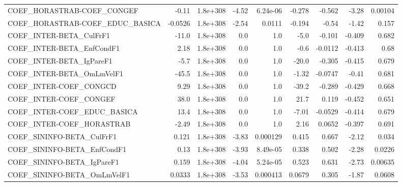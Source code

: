 \begin{tabular}{lrrrrrrrr}
COEF\_HORASTRAB-COEF\_CONGEF            &       -0.11 &     1.8e+308 &    -4.52 & 6.24e-06 &     -0.278 &      -0.562 &        -3.28 &       0.00104 \\
COEF\_HORASTRAB-COEF\_EDUC\_BASICA       &     -0.0526 &     1.8e+308 &    -2.54 &   0.0111 &     -0.194 &       -0.54 &        -1.42 &         0.157 \\
COEF\_INTER-BETA\_CulFrF1               &       -11.0 &     1.8e+308 &      0.0 &      1.0 &       -5.0 &      -0.101 &       -0.409 &         0.682 \\
COEF\_INTER-BETA\_EnfCondF1             &        2.18 &     1.8e+308 &      0.0 &      1.0 &       -0.6 &     -0.0112 &       -0.413 &          0.68 \\
COEF\_INTER-BETA\_IgPareF1              &        -5.7 &     1.8e+308 &      0.0 &      1.0 &      -20.0 &      -0.305 &       -0.415 &         0.679 \\
COEF\_INTER-BETA\_OmLmVelF1             &       -45.5 &     1.8e+308 &      0.0 &      1.0 &      -1.32 &     -0.0747 &        -0.41 &         0.681 \\
COEF\_INTER-COEF\_CONGCD                &        9.29 &     1.8e+308 &      0.0 &      1.0 &      -39.2 &      -0.289 &       -0.429 &         0.668 \\
COEF\_INTER-COEF\_CONGEF                &        38.0 &     1.8e+308 &      0.0 &      1.0 &       21.7 &       0.119 &       -0.452 &         0.651 \\
COEF\_INTER-COEF\_EDUC\_BASICA           &        13.4 &     1.8e+308 &      0.0 &      1.0 &      -7.01 &     -0.0529 &       -0.414 &         0.679 \\
COEF\_INTER-COEF\_HORASTRAB             &       -2.49 &     1.8e+308 &      0.0 &      1.0 &       2.16 &      0.0652 &       -0.397 &         0.691 \\
COEF\_SININFO-BETA\_CulFrF1             &       0.121 &     1.8e+308 &    -3.83 & 0.000129 &      0.415 &       0.667 &        -2.12 &         0.034 \\
COEF\_SININFO-BETA\_EnfCondF1           &        0.13 &     1.8e+308 &    -3.93 & 8.49e-05 &      0.338 &       0.502 &        -2.28 &        0.0226 \\
COEF\_SININFO-BETA\_IgPareF1            &       0.159 &     1.8e+308 &    -4.04 & 5.24e-05 &      0.523 &       0.631 &        -2.73 &       0.00635 \\
COEF\_SININFO-BETA\_OmLmVelF1           &      0.0333 &     1.8e+308 &    -3.53 & 0.000413 &     0.0679 &       0.305 &        -1.87 &        0.0608 \\

\end{tabular}
